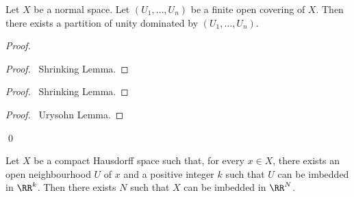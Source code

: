 \begin{theorem}
    \label{theorem:partition_of_unity}
    Let $X$ be a normal space. Let $(U_1, \ldots, U_n)$ be a finite open covering of $X$. Then there exists a partition of unity
    dominated by $(U_1, \ldots, U_n)$.
\end{theorem}

\begin{proof}
    \pf
    \begin{proof}
        \pf\ Shrinking Lemma.
    \end{proof}
    \begin{proof}
        \pf\ Shrinking Lemma.
    \end{proof}
    \begin{proof}
        \pf\ Urysohn Lemma.
    \end{proof}
    \qed
\end{proof}

\begin{theorem}
    \label{theorem:imbed_in_RN}
    Let $X$ be a compact Hausdorff space such that, for every $x \in X$, there exists an open neighbourhood $U$ of $x$ and a positive integer $k$
    such that $U$ can be imbedded in $\RR^k$. Then there exists $N$ such that $X$ can be imbedded in $\RR^N$.
\end{theorem}

